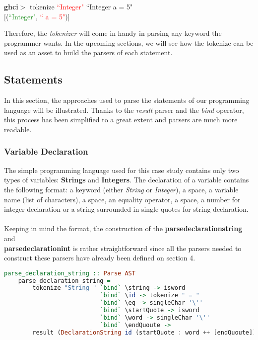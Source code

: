 \documentclass[a4paper, onecolumn]{article}
\begin{document}
    \begin{center}
            \textbf{ghci$>$} tokenize \textcolor{red}{``Integer"} ``Integer a = 5" \\
             $\big[$(\textcolor{green}{``Integer"}, \textcolor{red}{`` a = 5"})$\big]$
        \end{center}
    
    \noindent Therefore, the \textit{tokenizer} will come in handy in parsing any keyword the programmer wants. In the upcoming sections, we will see how the tokenize can be used as an asset to build the parsers of each statement. 
    
    \subsection{Statements}
    
    In this section, the approaches used to parse the statements of our programming language will be illustrated. Thanks to the \textit{result} parser and the \textit{bind} operator, this process has been simplified to a great extent and parsers are much more readable. 
    
    \subsubsection{Variable Declaration}
    
    The simple programming language used for this case study contains only two types of variables: \textbf{Strings} and \textbf{Integers}. The declaration of a variable contains the following format: a keyword (either \textit{String} or \textit{Integer}), a space, a variable name (list of characters), a space, an equality operator, a space, a number for integer declaration or a string surrounded in single quotes for string declaration. \\ \\
    Keeping in mind the format, the construction of the \textbf{parse\textunderscore declaration\textunderscore string} and \\ \textbf{parse\textunderscore declaration\textunderscore int} is rather straightforward since all the parsers needed to construct these parsers have already been defined on section 4.
    
    \begin{tcolorbox}
    \begin{lstlisting}[language=Haskell] 
    parse_declaration_string :: Parse AST
    parse_declaration_string = 
        tokenize "String " `bind` \string -> isword 
                           `bind` \id -> tokenize " = "          
                           `bind` \eq -> singleChar '\''  
                           `bind` \startQuote -> isword 
                           `bind` \word -> singleChar '\''    
                           `bind` \endQuoute -> 
        result (DeclarationString id (startQuote : word ++ [endQuoute])) 
     \end{lstlisting}
    \end{tcolorbox}
    
\end{document}
